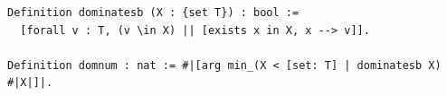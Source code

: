 \begin{lstlisting}[language=Rocq]
Definition dominatesb (X : {set T}) : bool :=
  [forall v : T, (v \in X) || [exists x in X, x --> v]].

Definition domnum : nat := #|[arg min_(X < [set: T] | dominatesb X) #|X|]|.
\end{lstlisting}
